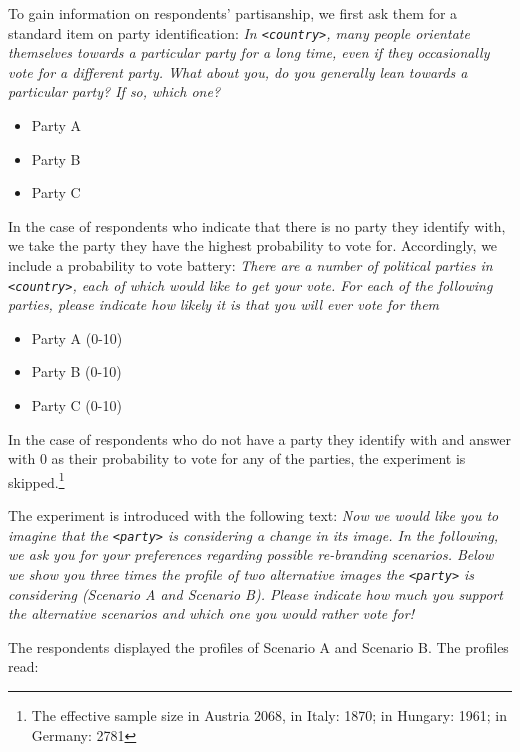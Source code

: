 \documentclass[12pt]{article}
\begin{document}
To gain information on respondents' partisanship, we first ask them for a standard item on party identification: \textit{In \texttt{<country>}, many people orientate themselves towards a particular party for a long time, even if they occasionally vote for a different party. What about you, do you generally lean towards a particular party? If so, which one?}
\begin{itemize}
  \item{Party A}
  \item{Party B}
  \item{Party C}
\end{itemize}
In the case of respondents who indicate that there is no party they identify with, we take the party they have the highest probability to vote for. Accordingly, we include a probability to vote battery: \textit{There are a number of political parties in \texttt{<country>}, each of which would like to get your vote. For each of the following parties, please indicate how likely it is that you will ever vote for them}
\begin{itemize}
  \item{Party A (0-10)}
  \item{Party B (0-10)}
  \item{Party C (0-10)}
\end{itemize}
In the case of respondents who do not have a party they identify with and answer with 0 as their probability to vote for any of the parties, the experiment is skipped.\footnote{The effective sample size in Austria 2068, in Italy: 1870; in Hungary: 1961; in Germany: 2781}

The experiment is introduced with the following text: \textit{Now we would like you to imagine that the \texttt{<party>} is considering a change in its image. In the following, we ask you for your preferences regarding possible re-branding scenarios. Below we show you three times the profile of two alternative images the \texttt{<party>} is considering (Scenario A and Scenario B). Please indicate how much you support the alternative scenarios and which one you would rather vote for!}

The respondents displayed the profiles of Scenario A and Scenario B. The profiles read:
\end{document}
